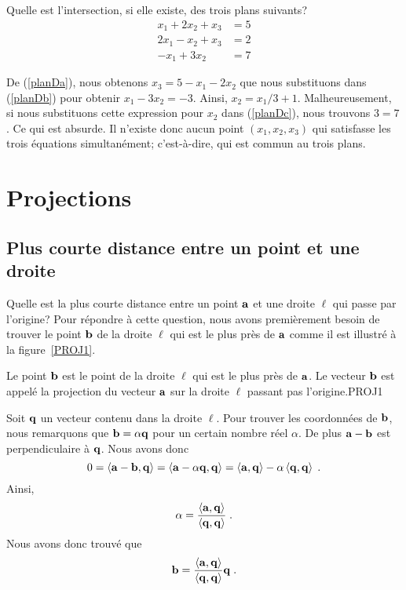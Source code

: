 {\begin{egg}
Quelle est l'intersection, si elle existe, des trois plans suivants?
\begin{subequations}\label{PlanD}
\begin{align}
x_1 + 2x_2 +x_3 &= 5 \label{planDa}\\ 
2x_1 -x_2 + x_3 &= 2 \label{planDb}\\
-x_1 + 3x_2 &= 7 \label{planDc}
\end{align}
\end{subequations}

De (\ref{planDa}), nous obtenons $x_3=5-x_1-2x_2$ que nous substituons dans
(\ref{planDb}) pour obtenir $x_1 -3 x_2 = -3$.  Ainsi, $x_2 = x_1/3 +1$.
Malheureusement, si nous substituons cette expression pour $x_2$ dans
(\ref{planDc}), nous trouvons $3 = 7$.  Ce qui est absurde.  Il n'existe donc
aucun point $(x_1,x_2,x_3)$ qui satisfasse les trois équations simultanément;
c'est-à-dire, qui est commun au trois plans.
\end{egg}

\section{Projections \theory}

\subsection{Plus courte distance entre un point et une droite}

Quelle est la plus courte distance entre un point $\mathbf{a}$ et une
droite $\ell$ qui passe par l'origine?  Pour répondre à cette
question, nous avons premièrement besoin de trouver le point $\mathbf{b}$
de la droite $\ell$ qui est le plus près de $\mathbf{a}$ comme il est
illustré à la figure~\ref{PROJ1}.

{Le point $\mathbf{b}$ est le point de la droite $\ell$ qui est le plus
près de $\mathbf{a}$.  Le vecteur $\mathbf{b}$ est appelé la projection du
vecteur $\mathbf{a}$ sur la droite $\ell$ passant pas l'origine.}{PROJ1}

Soit $\mathbf{q}$ un vecteur contenu dans la droite $\ell$.  Pour trouver
les coordonnées de $\mathbf{b}$, nous remarquons que $\mathbf{b} = \alpha \mathbf{q}$
pour un certain nombre réel $\alpha$.  De plus $\mathbf{a}-\mathbf{b}$ est
perpendiculaire à $\mathbf{q}$.  Nous avons donc
\[
0 = \left\langle{\mathbf{a}-\mathbf{b}} , {\mathbf{q}}\right\rangle
= \left\langle{\mathbf{a}- \alpha\mathbf{q}} , {\mathbf{q}}\right\rangle
= \left\langle{\mathbf{a}} , {\mathbf{q}}\right\rangle - \alpha \left\langle{\mathbf{q}} , {\mathbf{q}}\right\rangle \; .
\]
Ainsi,
\begin{equation}\label{expr_x}
\alpha = \frac{\left\langle{\mathbf{a}} , {\mathbf{q}}\right\rangle}{\left\langle{\mathbf{q}} , {\mathbf{q}}\right\rangle} \; .
\end{equation}
Nous avons donc trouvé que
\[
\mathbf{b} = \frac{\left\langle{\mathbf{a}} , {\mathbf{q}}\right\rangle}{\left\langle{\mathbf{q}} , {\mathbf{q}}\right\rangle} \mathbf{q} \; .
\]

}
